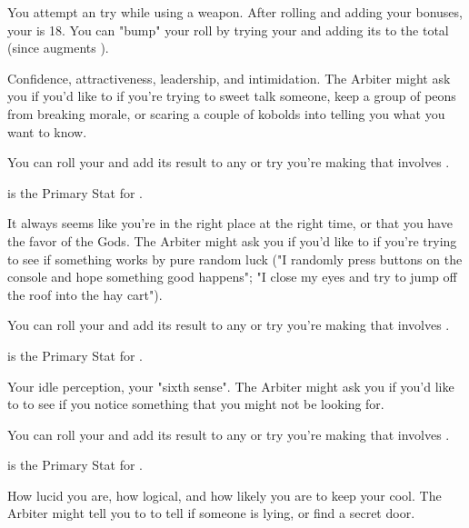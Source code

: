 \begin{multicols*}{2}
{    \myskip

    You attempt an  try while using a \VIG weapon. After rolling and adding your bonuses, your \SUMDICE is 18. You can "bump" your roll by trying your \PRE \UD and adding its \SUMDICE to the total (since \PRE augments \VIG). 
}

\newpage


Confidence, attractiveness, leadership, and intimidation. The Arbiter might ask you if you'd like to \RSTRY{\PRE} if you're trying to sweet talk someone, keep a group of peons from breaking morale, or scaring a couple of kobolds into telling you what you want to know. 

You can roll your \PRE and add its result to any \RO or \RB try you're making that involves \VIG.  

\PRE is the Primary Stat for .



It always seems like you're in the right place at the right time, or that you have the favor of the Gods. The Arbiter might ask you if you'd like to \RSTRY{\TAL} if you're trying to see if something works by pure random luck ("I randomly press buttons on the console and hope something good happens"; "I close my eyes and try to jump off the roof into the hay cart").  

You can roll your \TAL and add its result to any \RO or \RB try you're making that involves \DEX.  

\TAL is the Primary Stat for .



Your idle perception, your "sixth sense". The Arbiter might ask you if you'd like to \RSTRY{\AWA} to see if you notice something that you might not be  looking for.

You can roll your \AWA and add its result to any \RO or \RB try you're making that involves \INT.  

\AWA is the Primary Stat for .



How lucid you are, how logical, and how likely you are to keep your cool.  The Arbiter might tell you to \RSTRY{\CLR} to tell if someone is lying, or find a secret door.


\end{multicols*}
